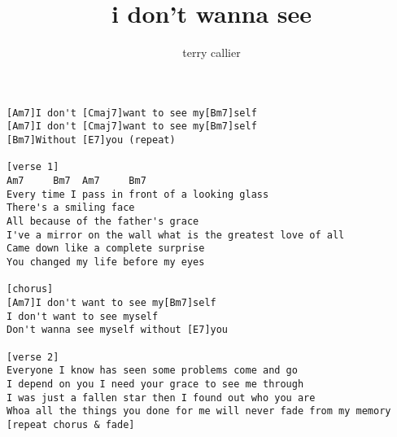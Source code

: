 \author{terry callier}
\title{i don't wanna see}
\maketitle
\begin{verbatim}
[Am7]I don't [Cmaj7]want to see my[Bm7]self
[Am7]I don't [Cmaj7]want to see my[Bm7]self
[Bm7]Without [E7]you (repeat)

[verse 1]
Am7     Bm7  Am7     Bm7
Every time I pass in front of a looking glass
There's a smiling face
All because of the father's grace
I've a mirror on the wall what is the greatest love of all
Came down like a complete surprise
You changed my life before my eyes

[chorus]
[Am7]I don't want to see my[Bm7]self
I don't want to see myself
Don't wanna see myself without [E7]you

[verse 2]
Everyone I know has seen some problems come and go
I depend on you I need your grace to see me through
I was just a fallen star then I found out who you are
Whoa all the things you done for me will never fade from my memory
[repeat chorus & fade]
\end{verbatim}
